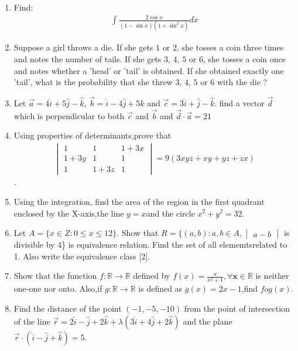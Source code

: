 \documentclass[10pt,-letter paper]{article}
\providecommand{\brak}[1]{\ensuremath{\left(#1\right)}}
\newcommand{\mydet}[1]{\ensuremath{\begin{vmatrix}#1\end{vmatrix}}}
\begin{document}
\begin{enumerate}
\item Find:
\begin{align*}
\int\frac{2\cos x}{\brak{1-\sin x}\brak{1+\sin^{2}x}}dx
\end{align*}

\item  Suppose a girl throws a die. If she gets $1$ or $2$, she tosses a coin three times and notes the number of tails. If she gets $3$, $4$, $5$ or $6$, she tosses a coin once and notes whether a 'head' or 'tail' is obtained. If she obtained exactly one 'tail', what is the probability that she threw $3$, $4$, $5$ or $6$ with the die ?

	\item Let $\overrightarrow{a}=4\hat{i}+5\hat{j}-\hat{k}$, $\overrightarrow{b}=\hat{i}-4\hat{j}+5\hat{k}$ and $\overrightarrow{c}=3\hat{i}+\hat{j}-\hat{k}$. find a vector $\overrightarrow{d}$ which is perpendicular to both $\overrightarrow{c}$ and $\overrightarrow{b}$ and $\overrightarrow{d}\cdot \overrightarrow{a}=21$

\item Using properties of determinants,prove that 
\begin{align*}
\mydet{1 & 1 & 1+3x \\ 1+3y & 1 & 1 \\ 1 & 1+3z & 1 }=9\brak{3xyz+xy+yz+zx}
	\end{align*}.

\item Using the integration, find the area of the region in the first quadrant enclosed by the X-axis,the line $y=x$and the circle $x^{2}+y^{2}=32$.

\item   Let $A=\{x \in Z : 0 \leq x \leq 12\}$. Show that  $R=\{\brak{a,b}: a,b \in A,\mydet{a-b}$ is divisible by $4$\} is equivalence relation. Find the set of all elememtsrelated to 1. Also write the equivalence class [2].

\item Show that the function $f:\mathbb{R}\rightarrow \mathbb{R}$ defined by $f\brak{x} = \frac{x}{x^{2}+1}, \forall \mathbf{x}\in \mathbb{R}$ is neither one-one nor onto. Also,if $g:\mathbb{R} \rightarrow \mathbb{R}$ is defined as $g\brak{x}=2x-1$,find $fog\brak{x}$.

\item  Find the distance of the point \brak{-1,-5,-10} from the point of intersection of the line $\overrightarrow{r}=2\hat{i}-\hat{j}+2\hat{k}+\lambda\brak{3\hat{i}+4\hat{j}+2\hat{k}}$ and the plane $\overrightarrow{r}\cdot\brak{\hat{i}-\hat{j}+\hat{k}}=5$.


\end{enumerate}
\end{document}
